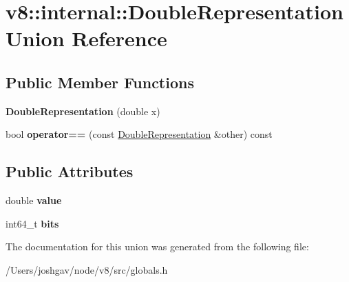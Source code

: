 \hypertarget{unionv8_1_1internal_1_1_double_representation}{}\section{v8\+:\+:internal\+:\+:Double\+Representation Union Reference}
\label{unionv8_1_1internal_1_1_double_representation}
\subsection*{Public Member Functions}
\begin{DoxyCompactItemize}
\item 
{\bfseries Double\+Representation} (double x)\hypertarget{unionv8_1_1internal_1_1_double_representation_a3f7fee6e49a095f811723cdfc720fa78}{}\label{unionv8_1_1internal_1_1_double_representation_a3f7fee6e49a095f811723cdfc720fa78}

\item 
bool {\bfseries operator==} (const \hyperlink{unionv8_1_1internal_1_1_double_representation}{Double\+Representation} \&other) const \hypertarget{unionv8_1_1internal_1_1_double_representation_a2a0850fc9ffd822d1c2eae8c6375f26a}{}\label{unionv8_1_1internal_1_1_double_representation_a2a0850fc9ffd822d1c2eae8c6375f26a}

\end{DoxyCompactItemize}
\subsection*{Public Attributes}
\begin{DoxyCompactItemize}
\item 
double {\bfseries value}\hypertarget{unionv8_1_1internal_1_1_double_representation_a95997c7237a215ff86b1d023eaac3fbc}{}\label{unionv8_1_1internal_1_1_double_representation_a95997c7237a215ff86b1d023eaac3fbc}

\item 
int64\+\_\+t {\bfseries bits}\hypertarget{unionv8_1_1internal_1_1_double_representation_a540b62c358b6661dea96c1769a048bbf}{}\label{unionv8_1_1internal_1_1_double_representation_a540b62c358b6661dea96c1769a048bbf}

\end{DoxyCompactItemize}


The documentation for this union was generated from the following file\+:\begin{DoxyCompactItemize}
\item 
/\+Users/joshgav/node/v8/src/globals.\+h\end{DoxyCompactItemize}
